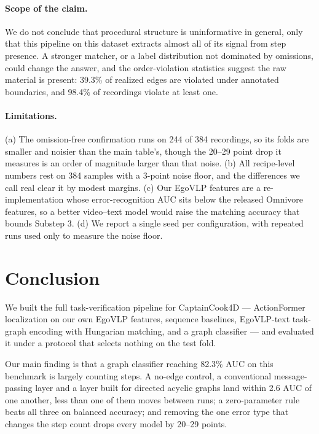 \documentclass[10pt,twocolumn,letterpaper]{article}
\begin{document}
\paragraph{Scope of the claim.} We do not conclude that procedural structure is
uninformative in general, only that this pipeline on this dataset extracts almost
all of its signal from step presence. A stronger matcher, or a label distribution
not dominated by omissions, could change the answer, and the order-violation
statistics suggest the raw material is present: 39.3\% of realized edges are
violated under annotated boundaries, and 98.4\% of recordings violate at least
one.

\paragraph{Limitations.} (a) The omission-free confirmation runs on 244 of 384
recordings, so its folds are smaller and noisier than the main table's, though the
20--29 point drop it measures is an order of magnitude larger than that noise.
(b) All recipe-level numbers rest on 384 samples with a 3-point noise floor, and
the differences we call real clear it by modest margins. (c) Our EgoVLP features
are a re-implementation whose error-recognition AUC sits below the released
Omnivore features, so a better video--text model would raise the matching accuracy
that bounds Substep 3. (d) We report a single seed per configuration, with repeated
runs used only to measure the noise floor.

\section{Conclusion}

We built the full task-verification pipeline for CaptainCook4D --- ActionFormer
localization on our own EgoVLP features, sequence baselines, EgoVLP-text task-graph
encoding with Hungarian matching, and a graph classifier --- and evaluated it under
a protocol that selects nothing on the test fold.

Our main finding is that a graph classifier reaching 82.3\% AUC on this benchmark
is largely counting steps. A no-edge control, a conventional message-passing layer
and a layer built for directed acyclic graphs land within 2.6 AUC of one another,
less than one of them moves between runs; a zero-parameter rule beats all three on
balanced accuracy; and removing the one error type that changes the step count
drops every model by 20--29 points.
\end{document}
